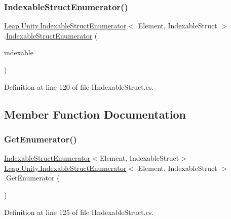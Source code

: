 \subsubsection{\texorpdfstring{IndexableStructEnumerator()}{IndexableStructEnumerator()}}
{\footnotesize\ttfamily \mbox{\hyperlink{struct_leap_1_1_unity_1_1_indexable_struct_enumerator}{Leap.\+Unity.\+Indexable\+Struct\+Enumerator}}$<$ Element, Indexable\+Struct $>$.\mbox{\hyperlink{struct_leap_1_1_unity_1_1_indexable_struct_enumerator}{Indexable\+Struct\+Enumerator}} (\begin{DoxyParamCaption}\item[{Indexable\+Struct}]{indexable }\end{DoxyParamCaption})}



Definition at line 120 of file I\+Indexable\+Struct.\+cs.



\subsection{Member Function Documentation}
\mbox{\label{struct_leap_1_1_unity_1_1_indexable_struct_enumerator_a6717ef4019da1f0e2e300a4ac3554cf6}} 
\subsubsection{\texorpdfstring{GetEnumerator()}{GetEnumerator()}}
{\footnotesize\ttfamily \mbox{\hyperlink{struct_leap_1_1_unity_1_1_indexable_struct_enumerator}{Indexable\+Struct\+Enumerator}}$<$Element, Indexable\+Struct$>$ \mbox{\hyperlink{struct_leap_1_1_unity_1_1_indexable_struct_enumerator}{Leap.\+Unity.\+Indexable\+Struct\+Enumerator}}$<$ Element, Indexable\+Struct $>$.Get\+Enumerator (\begin{DoxyParamCaption}{ }\end{DoxyParamCaption})}



Definition at line 125 of file I\+Indexable\+Struct.\+cs.

\mbox{\label{struct_leap_1_1_unity_1_1_indexable_struct_enumerator_afb9220e6b96b49d0328751b479b42507}} 
